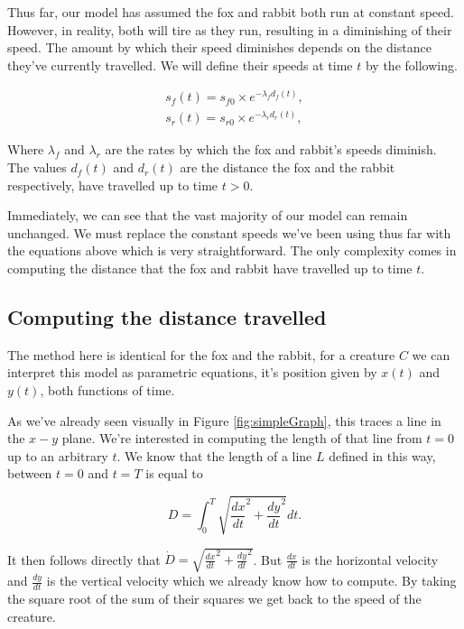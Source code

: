 Thus far, our model has assumed the fox and rabbit both run at constant speed. However, in reality, both will tire as they run, resulting in a diminishing of their speed. The amount by which their speed diminishes depends on the distance they've currently travelled. We will define their speeds at time $t$ by the following.

\begin{equation}\label{eq:speeds}
\begin{split}
 s_f(t) = s_{f0} \times  e^{-\lambda_f  d_f(t)}, \\
 s_r(t) = s_{r0} \times  e^{-\lambda_r d_r(t)}, 
\end{split}
\end{equation}

Where $\lambda_f$ and $\lambda_r$ are the rates by which the fox and rabbit's speeds diminish.  The values $d_f(t)$ and $d_r(t)$ are the distance the fox and the rabbit respectively, have travelled up to time $t > 0$.

Immediately, we can see that the vast majority of our model can remain unchanged. We must replace the constant speeds we've been using thus far with the equations above which is very straightforward. The only complexity comes in computing the distance that the fox and rabbit have travelled up to time $t$.

\subsection{Computing the distance travelled}

The method here is identical for the fox and the rabbit, for a creature $C$ we can interpret this model as parametric equations, it's position given by $x(t)$ and $y(t)$, both functions of time.

As we've already seen visually in Figure \ref{fig:simpleGraph}, this traces a line in the $x-y$ plane. We're interested in computing the length of that line from $t=0$ up to an arbitrary $t$. We know that the length of a line $L$ defined in this way, between $t=0$ and $t=T$ is equal to

$$ D = \int_0^T \sqrt{{\frac{dx}{dt}}^2 + {\frac{dy}{dt}}^2} dt .$$

It then follows directly that $ \dot{D} =  \sqrt{{\frac{dx}{dt}}^2 + {\frac{dy}{dt}}^2} $. But $\frac{dx}{dt}$ is the horizontal velocity and $\frac{dy}{dt}$ is the vertical velocity which we already know how to compute. By taking the square root of the sum of their squares we get back to the speed of the creature.

